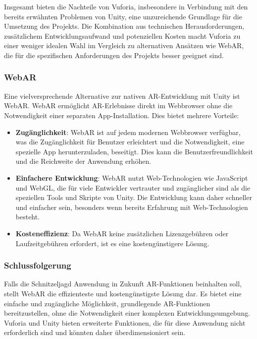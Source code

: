 Insgesamt bieten die Nachteile von Vuforia, insbesondere in Verbindung mit den bereits erwähnten Problemen von Unity, eine unzureichende Grundlage für die Umsetzung des Projekts. Die Kombination aus technischen Herausforderungen, zusätzlichem Entwicklungsaufwand und potenziellen Kosten macht Vuforia zu einer weniger idealen Wahl im Vergleich zu alternativen Ansätzen wie WebAR, die für die spezifischen Anforderungen des Projekts besser geeignet sind.


\subsubsection{WebAR}

Eine vielversprechende Alternative zur nativen AR-Entwicklung mit Unity ist WebAR. WebAR ermöglicht AR-Erlebnisse direkt im Webbrowser ohne die Notwendigkeit einer separaten App-Installation. Dies bietet mehrere Vorteile:

\begin{itemize}
    \item \textbf{Zugänglichkeit}: WebAR ist auf jedem modernen Webbrowser verfügbar, was die Zugänglichkeit für Benutzer erleichtert und die Notwendigkeit, eine spezielle App herunterzuladen, beseitigt. Dies kann die Benutzerfreundlichkeit und die Reichweite der Anwendung erhöhen.
    \item \textbf{Einfachere Entwicklung}: WebAR nutzt Web-Technologien wie JavaScript und WebGL, die für viele Entwickler vertrauter und zugänglicher sind als die speziellen Tools und Skripte von Unity. Die Entwicklung kann daher schneller und einfacher sein, besonders wenn bereits Erfahrung mit Web-Technologien besteht.
    \item \textbf{Kosteneffizienz}: Da WebAR keine zusätzlichen Lizenzgebühren oder Laufzeitgebühren erfordert, ist es eine kostengünstigere Lösung.
\end{itemize}

\subsubsection{Schlussfolgerung}

Falls die Schnitzeljagd Anwendung in Zukunft AR-Funktionen beinhalten soll, stellt WebAR die effizienteste und kostengünstigste Lösung dar. Es bietet eine einfache und zugängliche Möglichkeit, grundlegende AR-Funktionen bereitzustellen, ohne die Notwendigkeit einer komplexen Entwicklungsumgebung. Vuforia und Unity bieten erweiterte Funktionen, die für diese Anwendung nicht erforderlich sind und könnten daher überdimensioniert sein.

